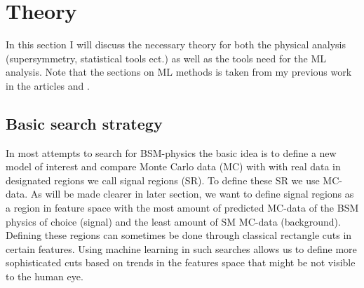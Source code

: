 \documentclass{article}
\begin{document}
\section{Theory}
In this section I will discuss the necessary theory for both the physical analysis (supersymmetry, statistical tools ect.) as well as the tools need for the ML analysis. Note that the sections on ML methods is taken from my previous work in the articles \cite{FYSSTK} and \cite{HIGGS}.
\subsection{Basic search strategy}
In most attempts to search for BSM-physics the basic idea is to define a new model of interest and compare Monte Carlo data (MC) with with real data in designated regions we call signal regions (SR). To define these SR we use MC-data. As will be made clearer in later section, we want to define signal regions as a region in feature space with the most amount of predicted MC-data of the BSM physics of choice (signal) and the least amount of SM MC-data (background). Defining these regions can sometimes be done through classical rectangle cuts in certain features. Using machine learning in such searches allows us to define more sophisticated cuts based on trends in the features space that might be not visible to the human eye.
\end{document}
